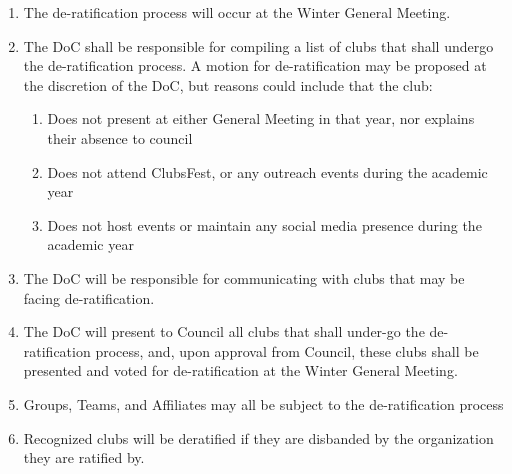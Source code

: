 \begin{enumerate}
 \item
  The de-ratification process will occur at the Winter General Meeting.
 \item
  The DoC shall be responsible for compiling a list of clubs that shall undergo the de-ratification process. A motion for de-ratification may be proposed at the discretion of the DoC, but reasons could include that the club:

  \begin{enumerate}
   \item
    Does not present at either General Meeting in that year, nor explains their absence to council
   \item
    Does not attend ClubsFest, or any outreach events during the academic year
   \item
    Does not host events or maintain any social media presence during the academic year
  \end{enumerate}
 \item
  The DoC will be responsible for communicating with clubs that may be facing de-ratification.
 \item
  The DoC will present to Council all clubs that shall under-go the de-ratification process, and, upon approval from Council, these clubs shall be presented and voted for de-ratification at the Winter General Meeting.
 \item
  Groups, Teams, and Affiliates may all be subject to the de-ratification process
 \item
  Recognized clubs will be deratified if they are disbanded by the organization they are ratified by.
\end{enumerate}
% 
